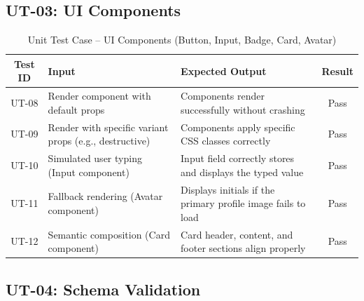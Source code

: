 \subsection{UT-03: UI Components}

\begin{table}[H]
\centering
\caption{Unit Test Case – UI Components (Button, Input, Badge, Card, Avatar)}
\begin{tabularx}{\textwidth}{|c|X|X|c|}
\hline
\textbf{Test ID} & \textbf{Input} & \textbf{Expected Output} & \textbf{Result} \\
\hline
UT-08 & Render component with default props & Components render successfully without crashing & Pass \\
\hline
UT-09 & Render with specific variant props (e.g., destructive) & Components apply specific CSS classes correctly & Pass \\
\hline
UT-10 & Simulated user typing (Input component) & Input field correctly stores and displays the typed value & Pass \\
\hline
UT-11 & Fallback rendering (Avatar component) & Displays initials if the primary profile image fails to load & Pass \\
\hline
UT-12 & Semantic composition (Card component) & Card header, content, and footer sections align properly & Pass \\
\hline
\end{tabularx}
\end{table}

\subsection{UT-04: Schema Validation}

